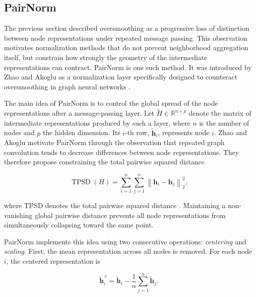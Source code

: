 \documentclass[english]{lni}
\begin{document}

\subsection{PairNorm}
\label{sec:pairnorm-background}

The previous section described oversmoothing as a progressive loss of distinction between node representations under repeated message
passing. This observation motivates normalization methods that do not prevent neighborhood aggregation itself, but constrain how strongly
the geometry of the intermediate representations can contract. PairNorm is one such method. It was introduced by Zhao and Akoglu as
a normalization layer specifically designed to counteract oversmoothing in graph neural networks \cite{zhao2020pairnorm}.

The main idea of PairNorm is to control the global spread of the node representations after a message-passing layer. Let
$\widetilde{H}\in\mathbb{R}^{n\times p}$ denote the matrix of intermediate representations produced by such a layer, where $n$ is
the number of nodes and $p$ the hidden dimension. Its $i$-th row, $\widetilde{\mathbf{h}}_i$, represents node $i$. Zhao and Akoglu
motivate PairNorm through the observation that repeated graph convolution tends to decrease differences between node
representations. They therefore propose constraining the total pairwise squared distance

\begin{equation}
    \operatorname{TPSD}(H)
    =
    \sum_{i=1}^{n}
    \sum_{j=1}^{n}
    \left\|
        \mathbf{h}_i-\mathbf{h}_j
    \right\|_2^2 ,
    \label{eq:pairnorm-tpsd}
\end{equation}

where TPSD denotes the total pairwise squared distance \cite{zhao2020pairnorm}. Maintaining a non-vanishing global pairwise
distance prevents all node representations from simultaneously collapsing toward the same point.

PairNorm implements this idea using two consecutive operations: \emph{centering} and \emph{scaling}. First, the mean representation
across all nodes is removed. For each node $i$, the centered representation is

\begin{equation}
    \widetilde{\mathbf{h}}^{\,c}_i
    =
    \widetilde{\mathbf{h}}_i
    -
    \frac{1}{n}
    \sum_{j=1}^{n}
    \widetilde{\mathbf{h}}_j .
    \label{eq:pairnorm-center}
\end{equation}
\end{document}
